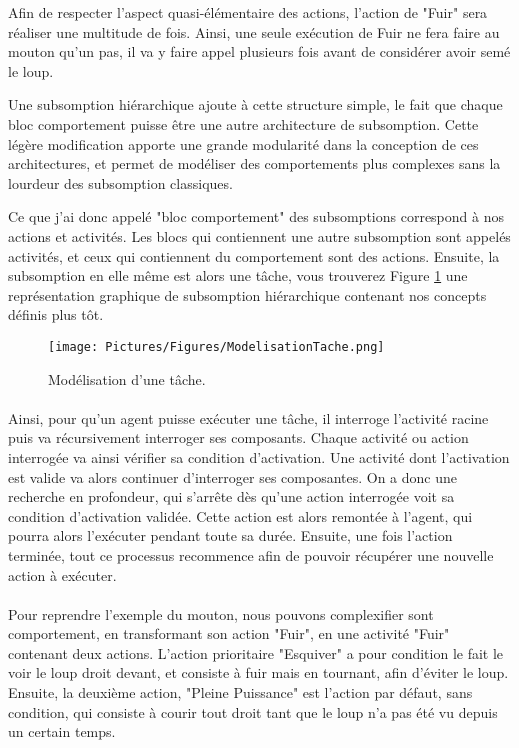 \documentclass[11pt,a4paper]{report}
\begin{document}
			Afin de respecter l'aspect quasi-élémentaire des actions, l'action de "Fuir" sera réaliser une multitude de fois. Ainsi, une seule exécution de Fuir ne fera faire au mouton qu'un pas, il va y faire appel plusieurs fois avant de considérer avoir semé le loup.
			
			Une subsomption hiérarchique ajoute à cette structure simple, le fait que chaque bloc comportement puisse être une autre architecture de subsomption. Cette légère modification apporte une grande modularité dans la conception de ces architectures, et permet de modéliser des comportements plus complexes sans la lourdeur des subsomption classiques.
			
			Ce que j'ai donc appelé "bloc comportement" des subsomptions correspond à nos actions et activités. Les blocs qui contiennent une autre subsomption sont appelés activités, et ceux qui contiennent du comportement sont des actions. Ensuite, la subsomption en elle même est alors une tâche, vous trouverez Figure \ref{ModelisationTache} une représentation graphique de subsomption hiérarchique contenant nos concepts définis plus tôt.
			
			\begin{figure}
			\centering
			\texttt{[image: Pictures/Figures/ModelisationTache.png]}
			\caption{Modélisation d'une tâche.}
			\label{ModelisationTache}
			\end{figure}
		\paragraph{}
			Ainsi, pour qu'un agent puisse exécuter une tâche, il interroge l'activité racine puis va récursivement interroger ses composants. Chaque activité ou action interrogée va ainsi vérifier sa condition d'activation. Une activité dont l'activation est valide va alors continuer d'interroger ses composantes. On a donc une recherche en profondeur, qui s'arrête dès qu'une action interrogée voit sa condition d'activation validée. Cette action est alors remontée à l'agent, qui pourra alors l'exécuter pendant toute sa durée. Ensuite, une fois l'action terminée, tout ce processus recommence afin de pouvoir récupérer une nouvelle action à exécuter.
			
			\paragraph{}
			Pour reprendre l'exemple du mouton, nous pouvons complexifier sont comportement, en transformant son action "Fuir", en une activité "Fuir" contenant deux actions. L'action prioritaire "Esquiver" a pour condition le fait le voir le loup droit devant, et consiste à fuir mais en tournant, afin d'éviter le loup. Ensuite, la deuxième action, "Pleine Puissance" est l'action par défaut, sans condition, qui consiste à courir tout droit tant que le loup n'a pas été vu depuis un certain temps.
			
\end{document}
